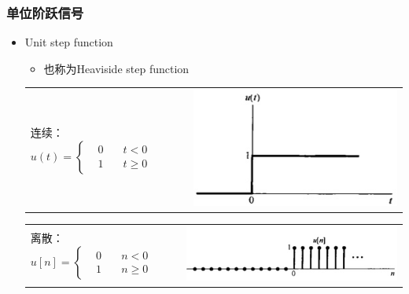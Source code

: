 \documentclass[CJKutf8,dvipsnames,table]{beamer}
\begin{document}
\begin{CJK*}{UTF8}{song}
  \begin{frame}
    \frametitle{单位阶跃信号}
    \begin{itemize}
    \item Unit step function
    \begin{itemize}
    \item 也称为Heaviside step function
    \end{itemize}    
    
	\begin{tabular}{ll}
	\raisebox{-.5\height}

    连续：
    \begin{math}
u(t) = 
\left\{
    \begin {aligned}
         & 0 \quad & t < 0 \\
         & 1 \quad & t \geq 0                  
    \end{aligned}
\right.
	\end{math}

&
    \includegraphics[valign=m,scale=.3]{cunitstepfunction}    \\
    \end{tabular}    

	\begin{tabular}{ll}
	\raisebox{-.5\height}

    离散：
    \begin{math}
u[n] = 
\left\{
    \begin {aligned}
         & 0 \quad & n < 0 \\
         & 1 \quad & n \geq 0                  
    \end{aligned}
\right.
	\end{math}

&
    \includegraphics[valign=m,scale=.4]{dunitstepfunction}    \\
    \end{tabular}   


\end{itemize}
\end{frame}
\end{CJK*}
\end{document}
